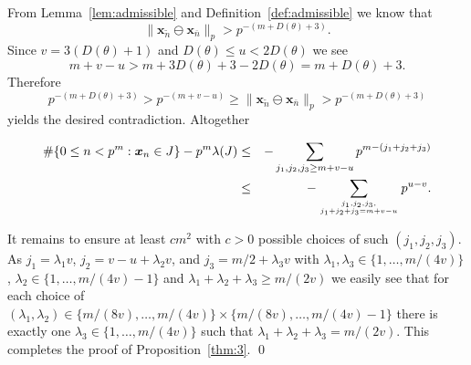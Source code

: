 \documentclass{article}
\newcommand{\bsx}{\boldsymbol{x}}%
\renewcommand{\(}{\left (}
\renewcommand{\)}{\right )}
\newtheorem{lemma}[theorem]{Lemma}
\theoremstyle{definition}
\numberwithin{equation}{section}
\begin{document}
From Lemma~\ref{lem:admissible} and Definition~\ref{def:admissible} we know that 
$$\|\bsx_{\tilde{n}}\ominus \bsx_{{\overline{n}}}\|_p>p^{-(m+D(\theta)+3)}.$$ 
Since $v=3(D(\theta)+1)$ and $D(\theta)\leq u<2D(\theta)$ we see 
$$m+v-u>m+3D(\theta)+3-2D(\theta)=m+D(\theta)+3.$$
Therefore 
$$p^{-(m+D(\theta)+3)}>p^{-(m+v-u)}\geq \|\bsx_{\tilde{n}}\ominus \bsx_{{\overline{n}}}\|_p>p^{-(m+D(\theta)+3)}$$
yields the desired contradiction. Altogether

\begin{eqnarray*}
\#\{0\leq n<p^m:\bsx_n\in J\}-p^m\lambda (J)&\leq& -\sum_{j_1,j_2,j_3\geq m+v-u}p^{m-(j_1+j_2+j_3)}\\
&\leq& -\sum_{{j_1,j_2,j_3,}\atop {j_1+j_2+j_3= m+v-u}}p^{u-v}.
\end{eqnarray*}

It remains to ensure at least $c m^2$ with $c>0$ possible choices of such $(j_1,j_2,j_3)$. As $j_1=\lambda_1 v$, $j_2=v-u+\lambda_2 v$, and $j_3=m/2 +\lambda_3 v$ with $\lambda_1,\lambda_3\in\{1,\ldots,m/(4v)\}$, $\lambda_2\in \{1,\ldots,m/(4v)-1\}$ and $\lambda_1+\lambda_2+\lambda_3\geq m/(2v)$ we easily see that for each choice of $(\lambda_1,\lambda_2)\in \{m/(8v),\ldots,m/(4v)\}\times  \{m/(8v),\ldots,m/(4v)-1\}$ there is exactly one $\lambda_3\in \{1,\ldots,m/(4v)\}$ such that $\lambda_1+\lambda_2+\lambda_3=m/(2v)$. This completes the proof of Proposition~\ref{thm:3}. \qed

















\end{document}
